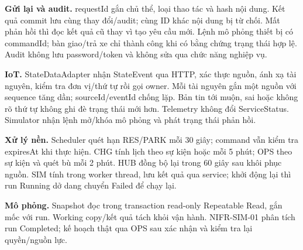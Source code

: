 \textbf{Gửi lại và audit.} requestId gắn chủ thể, loại thao tác và hash nội dung. Kết quả commit lưu cùng thay đổi/audit; cùng ID khác nội dung bị từ chối. Mất phản hồi thì đọc kết quả cũ thay vì tạo yêu cầu mới. Lệnh mô phỏng thiết bị có commandId; bàn giao/trả xe chỉ thành công khi có bằng chứng trạng thái hợp lệ. Audit không lưu password/token và không sửa qua chức năng nghiệp vụ.

\textbf{IoT.} StateDataAdapter nhận StateEvent qua HTTP, xác thực nguồn, ánh xạ tài nguyên, kiểm tra đơn vị/thứ tự rồi gọi owner. Mỗi tài nguyên gắn một nguồn với sequence tăng dần; sourceId/eventId chống lặp. Bản tin tới muộn, sai hoặc không rõ thứ tự không ghi đè trạng thái mới hơn. Telemetry không đổi ServiceStatus. Simulator nhận lệnh mở/khóa mô phỏng và phát trạng thái phản hồi.

\textbf{Xử lý nền.} Scheduler quét hạn RES/PARK mỗi 30 giây; command vẫn kiểm tra expiresAt khi thực hiện. CHG tính lịch theo sự kiện hoặc mỗi 5 phút; OPS theo sự kiện và quét bù mỗi 2 phút. HUB đồng bộ lại trong 60 giây sau khôi phục nguồn. SIM tính trong worker thread, lưu kết quả qua service; khởi động lại thì run Running dở dang chuyển Failed để chạy lại.

\textbf{Mô phỏng.} Snapshot đọc trong transaction read-only Repeatable Read, gắn mốc với run. Working copy/kết quả tách khỏi vận hành. NIFR-SIM-01 phân tích run Completed; kế hoạch thật qua OPS sau xác nhận và kiểm tra lại quyền/nguồn lực.
\fi
